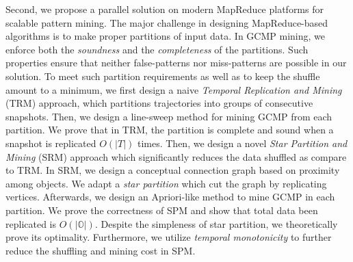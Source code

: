 


%

Second, we propose a parallel solution on modern MapReduce platforms for scalable pattern mining.
The major challenge in designing MapReduce-based algorithms is to make proper partitions of input data.
In GCMP mining, we enforce both the \emph{soundness} and the \emph{completeness} 
of the partitions. Such properties ensure that neither false-patterns 
nor miss-patterns are possible in our solution. To meet such partition requirements
as well as to keep the shuffle amount to a minimum, 
we first design a naive \emph{Temporal Replication and Mining} (TRM)
approach, which partitions trajectories into groups of consecutive snapshots. Then, we design a line-sweep
method for mining GCMP from each partition. We prove that in TRM, the partition is complete and sound when a snapshot is replicated $O(|T|)$ times. 
Then, we design a novel \emph{Star Partition and Mining} (SRM) approach which significantly reduces the data shuffled
as compare to TRM. In SRM, we design a conceptual connection graph based on proximity among objects. We adapt
a \emph{star partition} which cut the graph by replicating vertices. Afterwards, we design an Apriori-like method to mine
GCMP in each partition. We prove the correctness of SPM and show that total data been replicated is $O(|\mathbb{O}|)$. 
Despite the simpleness of star partition, we theoretically prove its optimality.
Furthermore, we utilize \emph{temporal monotonicity} to further reduce the 
shuffling and mining cost in SPM. 



